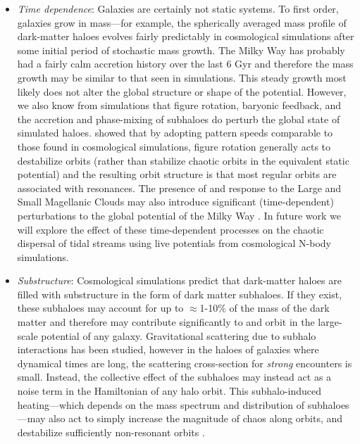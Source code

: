 \documentclass[letterpaper,12pt,preprint]{aastex}
\newcommand{\chchchanges}[1]{{\color{red} {#1}}}
\begin{document}
\begin{itemize}
\item \emph{Time dependence}: Galaxies are certainly not static systems. To first order, galaxies grow in mass---for example, the spherically averaged mass profile of dark-matter haloes evolves fairly predictably in cosmological simulations \citep{wechsler02, buist14} after some initial period of stochastic mass growth. The Milky Way has probably had a fairly calm accretion history over the last 6 Gyr and therefore the mass growth may be similar to that seen in simulations. This steady growth most likely does not alter the global structure or shape of the potential. However, we also know from simulations that figure rotation, baryonic feedback, and the accretion and phase-mixing of subhaloes do perturb the global state of simulated haloes. \cite{deibel11} showed that by adopting pattern speeds comparable to those found in cosmological simulations, figure rotation generally acts to destabilize orbits (rather than stabilize chaotic orbits in the equivalent static potential) and the resulting orbit structure is that most regular orbits are associated with resonances. \chchchanges{The presence of and response to the Large and Small Magellanic Clouds may also introduce significant (time-dependent) perturbations to the global potential of the Milky Way \citep[e.g.,][]{besla10, gomez15}}. In future work we will explore the effect of these time-dependent processes on the chaotic dispersal of tidal streams using live potentials from cosmological N-body simulations.

\item \emph{Substructure}: Cosmological simulations predict that dark-matter haloes are filled with substructure in the form of dark matter subhaloes. If they exist, these subhaloes may account for up to $\approx$1-10\% of the mass of the dark matter \citep[e.g.,][]{diemand07} and therefore may contribute significantly to and orbit in the large-scale potential of any galaxy. Gravitational scattering due to subhalo interactions has been studied, however in the haloes of galaxies where dynamical times are long, the scattering cross-section for \emph{strong} encounters is small. Instead, the collective effect of the subhaloes may instead act as a noise term in the Hamiltonian of any halo orbit. This subhalo-induced heating---which depends on the mass spectrum and distribution of subhaloes---may also act to simply increase the magnitude of chaos along orbits, and destabilize sufficiently non-resonant orbits \citep[see, e.g.,][]{kandrup00, siegalgaskins08}.

\end{itemize}
\end{document}
